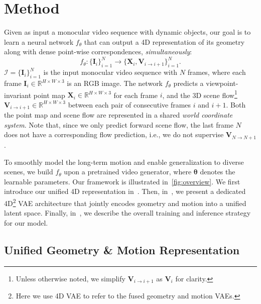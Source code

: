 \section{Method}
\label{sec:method}

Given as input a monocular video sequence with dynamic objects,
our goal is to learn a neural network $f_\theta$ that can output a 4D representation of its geometry along with dense point-wise correspondences, \emph{simultaneously}:
\begin{equation}
    \label{eq:goal}
    f_\theta: \{\bm{I}_i\}_{i=1}^N \rightarrow
    \{\bm{X}_i, \bm{V}_{i\rightarrow i+1}\}_{i=1}^N.
\end{equation}
$\mathcal{I}=\{\bm{I}_i\}_{i=1}^N$ is the input monocular video sequence with $N$ frames,
where each frame
$\bm{I}_i\in\mathbb{R}^{H\times W\times 3}$
is an RGB image.
The network
$f_\theta$
predicts a viewpoint-invariant point map
$\bm{X}_i\in\mathbb{R}^{H\times W\times 3}$ for each frame $i$,
and the 3D scene flow\footnote{Unless otherwise noted,
we simplify $\bm{V}_{i\rightarrow i+1}$ as $\bm{V}_{i}$ for clarity.}
$\bm{V}_{i\rightarrow i+1}\in\mathbb{R}^{H\times W\times 3}$
between each pair of consecutive frames $i$ and $i+1$.
Both the point map and scene flow are represented in a shared \emph{world coordinate system}.
Note that,
since we only predict forward scene flow,
the last frame
$N$
does not have a corresponding flow prediction,
i.e., we do not supervise $\bm{V}_{N\rightarrow N+1}$.


To smoothly model the long-term motion and enable generalization to diverse scenes,
we build $f_\theta$ upon a pretrained video generator,
where $\boldsymbol{\theta}$ denotes the learnable parameters.
Our framework is illustrated in~\cref{fig:overview}.
We first introduce our unified 4D representation in~.
Then,
in~,
we present a dedicated 4D\footnote{Here we use 4D VAE to refer to the fused geometry and motion VAEs.} VAE architecture that jointly encodes geometry and motion into a unified latent space.
Finally,
in~,
we describe the overall training and inference strategy for our model.


\subsection{Unified Geometry \& Motion Representation}
\label{sec:method_pre}

